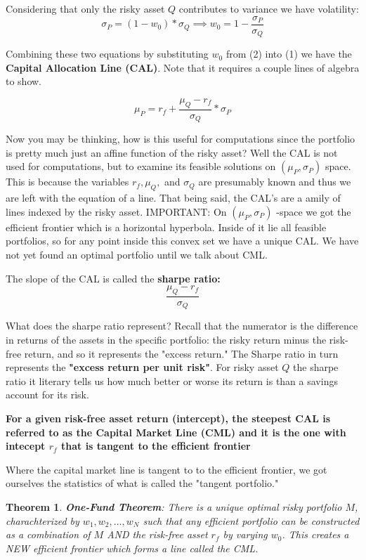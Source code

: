 \documentclass{article}
\newtheorem{theorem}{Theorem}
\begin{document}
Considering that only the risky asset $Q$ contributes to variance we have volatility:
\[ \sigma_P = (1-w_0)*\sigma_Q 
\implies 
w_0 = 1- \frac{\sigma_P}{\sigma_Q}
\]

Combining these two equations by substituting $w_0$ from (2) into (1) we have the \textbf{Capital Allocation Line (CAL)}. Note that it requires a couple lines of algebra to show. 

\[ \mu_P = r_f + \frac{\mu_Q - r_f}{\sigma_Q} * \sigma_P \]


Now you may be thinking, how is this useful for computations since the portfolio is pretty much just an affine function of the risky asset? Well the CAL is not used for computations, but to examine its feasible solutions on $( \mu_P, \sigma_P)$ space. This is because the variables $r_f, \mu_Q,$ and $\sigma_Q$ are presumably known and thus we are left with the equation of a line. That being said, the CAL's are a amily of lines indexed by the risky asset. IMPORTANT: On $(\mu_P,  \sigma_P)$ -space we got the efficient frontier which is a horizontal hyperbola. Inside of it lie all feasible portfolios, so for any point inside this convex set we have a unique CAL. We have not yet found an optimal portfolio until we talk about CML.


The slope of the CAL is called the \textbf{sharpe ratio:}
\[ \frac{ \mu_Q - r_f}{ \sigma_Q } \]  

What does the sharpe ratio represent? Recall that the numerator is the difference in returns of the assets in the specific portfolio: the risky return minus the risk-free return, and so it represents the "excess return." The Sharpe ratio in turn represents the \textbf{"excess return per unit risk"}. For risky asset $Q$ the sharpe ratio it literary tells us how much better or worse its return is than a savings account for its risk. 


\textbf{For a given risk-free asset return (intercept), the steepest CAL is referred to as the Capital Market Line (CML) and it is the one with intecept $r_f$ that is tangent to the efficient frontier}

Where the capital market line is tangent to to the efficient frontier, we got ourselves the statistics of what is called the "tangent portfolio."

\begin{theorem}
\textbf{One-Fund Theorem}: There is a unique optimal risky portfolio $M$, charachterized by $w_1, w_2, \dots, w_N$ such that any efficient portfolio can be \textit{constructed} as a combination of $M$ AND the risk-free asset $r_f$ by varying $w_0$. This creates a NEW efficient frontier which forms a line called the CML. 
\end{theorem}
\end{document}
